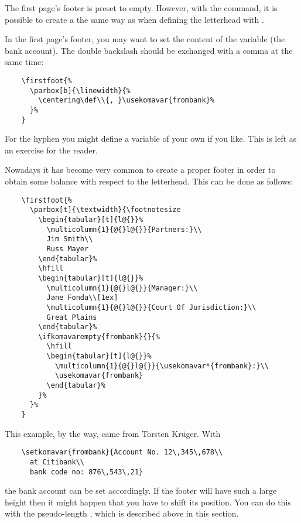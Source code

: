 \begin{Declaration}
\end{Declaration}
%
The first page's footer is preset to empty. However, with the
 command, it is possible to create a
 the same way as when defining the letterhead with
.
\begin{Example}
  In the first page's footer, you may want to set the content of the
  variable  (the bank account). The double
  backslash should be exchanged with a comma at the same time:
  \begin{lstlisting}
    \firstfoot{%
      \parbox[b]{\linewidth}{%
        \centering\def\\{, }\usekomavar{frombank}%
      }%
    }
  \end{lstlisting}
  For the hyphen you might define a variable of your own if you like.
  This is left as an exercise for the reader.
  
  Nowadays it has become very common to create a proper footer in
  order to obtain some balance with respect to the letterhead. This
  can be done as follows:
  \begin{lstlisting}
    \firstfoot{%
      \parbox[t]{\textwidth}{\footnotesize
        \begin{tabular}[t]{l@{}}%
          \multicolumn{1}{@{}l@{}}{Partners:}\\
          Jim Smith\\
          Russ Mayer
        \end{tabular}%
        \hfill
        \begin{tabular}[t]{l@{}}%
          \multicolumn{1}{@{}l@{}}{Manager:}\\
          Jane Fonda\\[1ex]
          \multicolumn{1}{@{}l@{}}{Court Of Jurisdiction:}\\
          Great Plains
        \end{tabular}%
        \ifkomavarempty{frombank}{}{%
          \hfill
          \begin{tabular}[t]{l@{}}%
            \multicolumn{1}{@{}l@{}}{\usekomavar*{frombank}:}\\
            \usekomavar{frombank}
          \end{tabular}%
        }%
      }%
    }
  \end{lstlisting}
  This example, by the way, came from Torsten Kr\"uger. With
  \begin{lstlisting}
    \setkomavar{frombank}{Account No. 12\,345\,678\\
      at Citibank\\
      bank code no: 876\,543\,21}
  \end{lstlisting}
  the bank account can be set accordingly. If the footer will have
  such a large height then it might happen that you have to shift its
  position. You can do this with the pseudo-length
  , which is
  described above in this section.
\end{Example}

